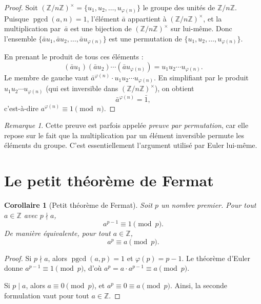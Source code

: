 \documentclass[12pt,a4paper,openany]{book}
\theoremstyle{definition}
\theoremstyle{plain}
\newtheorem{corollaire}[definition]{Corollaire}
\theoremstyle{remark}
\newtheorem{remarque}[definition]{Remarque}
\newcommand{\Z}{\mathbb{Z}}
\DeclareMathOperator{\pgcd}{pgcd}
\begin{document}
\begin{proof}
Soit $(\Z/n\Z)^\times = \{u_1, u_2, \ldots, u_{\varphi(n)}\}$ le groupe des unités
de $\Z/n\Z$. Puisque $\pgcd(a, n) = 1$, l'élément $\bar{a}$ appartient à
$(\Z/n\Z)^\times$, et la multiplication par~$\bar{a}$ est une bijection de
$(\Z/n\Z)^\times$ sur lui-même. Donc l'ensemble
$\{\bar{a} u_1, \bar{a} u_2, \ldots, \bar{a} u_{\varphi(n)}\}$
est une permutation de $\{u_1, u_2, \ldots, u_{\varphi(n)}\}$.

En prenant le produit de tous ces éléments :
\[
  (\bar{a} u_1)(\bar{a} u_2) \cdots (\bar{a} u_{\varphi(n)})
  = u_1 u_2 \cdots u_{\varphi(n)}.
\]
Le membre de gauche vaut $\bar{a}^{\varphi(n)} \cdot u_1 u_2 \cdots u_{\varphi(n)}$.
En simplifiant par le produit $u_1 u_2 \cdots u_{\varphi(n)}$ (qui est inversible
dans $(\Z/n\Z)^\times$), on obtient
\[
  \bar{a}^{\varphi(n)} = \bar{1},
\]
c'est-à-dire $a^{\varphi(n)} \equiv 1 \pmod{n}$.
\end{proof}

\begin{remarque}
Cette preuve est parfois appelée \emph{preuve par permutation},
car elle repose sur le fait que la multiplication par un élément inversible permute
les éléments du groupe. C'est essentiellement l'argument utilisé par Euler lui-même.
\end{remarque}

\section{Le petit théorème de Fermat}
\label{sec:fermat-petit}

\begin{corollaire}[Petit théorème de Fermat]
\label{cor:petit-fermat}
Soit $p$ un nombre premier. Pour tout $a \in \Z$ avec $p \nmid a$,
\[
  a^{p-1} \equiv 1 \pmod{p}.
\]
De manière équivalente, pour tout $a \in \Z$,
\[
  a^p \equiv a \pmod{p}.
\]
\end{corollaire}

\begin{proof}
Si $p \nmid a$, alors $\pgcd(a, p) = 1$ et $\varphi(p) = p - 1$. Le théorème
d'Euler donne $a^{p-1} \equiv 1 \pmod{p}$, d'où $a^p = a \cdot a^{p-1} \equiv a
\pmod{p}$.

Si $p \mid a$, alors $a \equiv 0 \pmod{p}$, et $a^p \equiv 0 \equiv a \pmod{p}$.
Ainsi, la seconde formulation vaut pour tout $a \in \Z$.
\end{proof}
\end{document}
